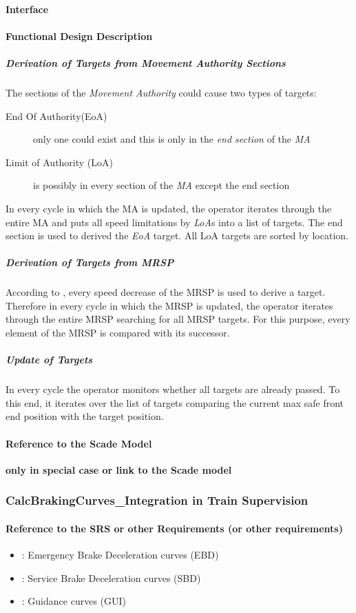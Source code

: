 \paragraph{Interface}

\paragraph{Functional Design Description}
\subparagraph{Derivation of Targets from Movement Authority Sections}
The sections of the \emph{Movement Authority} could cause two types of targets:
\begin{description}
\item[End Of Authority(EoA)] only one could exist and this is only in the \emph{end section} of the \emph{MA}
\item[Limit of Authority (LoA)] is possibly in every section of the \emph{MA} except the end section
\end{description}
In every cycle in which the MA is updated, the operator iterates through the entire MA and puts all speed limitations by \emph{LoA}s into a list of targets. The end section is used to derived the \emph{EoA} target. All LoA targets are sorted by location.

\subparagraph{Derivation of Targets from MRSP}
According to \cite[Chapt.~3.13.8.2]{subset-026}, every speed decrease of the MRSP is used to derive a target. Therefore in every cycle in which the MRSP is updated, the operator iterates through the entire MRSP searching for all MRSP targets. For this purpose, every element of the MRSP is compared with its successor.

\subparagraph{Update of Targets}
In every cycle the operator monitors whether all targets are already passed. To this end, it iterates over the list of targets comparing the current max safe front end position with the target position.

 


\paragraph{Reference to the Scade Model}
\textbf{only in special case or link to the Scade model}

\subsubsection{CalcBrakingCurves\_Integration in Train Supervision}
\paragraph{Reference to the SRS or other Requirements (or other requirements)}
\begin{itemize}
	\item \cite[Chapt.~3.13.8.3]{subset-026}: Emergency Brake Deceleration curves (EBD)
	\item \cite[Chapt.~3.13.8.4]{subset-026}: Service Brake Deceleration curves (SBD)
	\item \cite[Chapt.~3.13.8.5]{subset-026}: Guidance curves (GUI)
\end{itemize}
